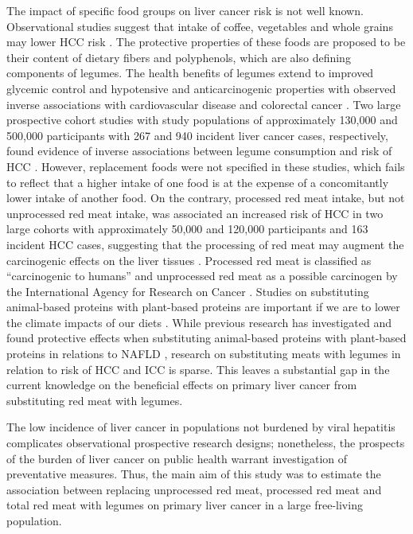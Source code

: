\documentclass[nutrients,article,submit,moreauthors,pdftex]{Definitions/mdpi}
\begin{document}
The impact of specific food groups on liver cancer risk is not well
known. Observational studies suggest that intake of coffee, vegetables
and whole grains may lower HCC risk \citep{zhang2013, yang2014, Liu2021, Bhurwal2020}. The protective properties of these foods are proposed to
be their content of dietary fibers and polyphenols, which are also
defining components of legumes. The health benefits of legumes extend to
improved glycemic control and hypotensive and anticarcinogenic
properties with observed inverse associations with cardiovascular
disease and colorectal cancer \citep{viguiliouk2019, jin2022}. Two large
prospective cohort studies with study populations of approximately
130,000 and 500,000 participants with 267 and 940 incident liver cancer
cases, respectively, found evidence of inverse associations between
legume consumption and risk of HCC \citep{zhang2013, Liu2021}. However,
replacement foods were not specified in these studies, which fails to
reflect that a higher intake of one food is at the expense of a
concomitantly lower intake of another food. On the contrary, processed
red meat intake, but not unprocessed red meat intake, was associated an
increased risk of HCC in two large cohorts with approximately 50,000 and
120,000 participants and 163 incident HCC cases, suggesting that the
processing of red meat may augment the carcinogenic effects on the liver
tissues \citep{Ma2019}. Processed red meat is classified as ``carcinogenic to
humans'' and unprocessed red meat as a possible carcinogen by the
International Agency for Research on Cancer \citep{Bouvard2015}. Studies on
substituting animal-based proteins with plant-based proteins are
important if we are to lower the climate impacts of our diets \citep{RN71}.
While previous research has investigated and found protective effects
when substituting animal-based proteins with plant-based proteins in
relations to NAFLD \citep{Zhang2023}, research on substituting meats with
legumes in relation to risk of HCC and ICC is sparse. This leaves a
substantial gap in the current knowledge on the beneficial effects on
primary liver cancer from substituting red meat with legumes.

The low incidence of liver cancer in populations not burdened by viral
hepatitis complicates observational prospective research designs;
nonetheless, the prospects of the burden of liver cancer on public
health warrant investigation of preventative measures. Thus, the main
aim of this study was to estimate the association between replacing
unprocessed red meat, processed red meat and total red meat with legumes
on primary liver cancer in a large free-living population.
\end{document}
